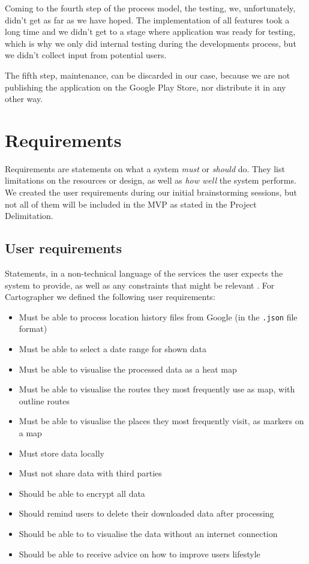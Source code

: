 \documentclass[12p]{article}
\begin{document}
Coming to the fourth step of the process model, the testing, we, unfortunately, didn't get as far as we have hoped. The implementation of all features took a long time and we didn't get to a stage where application was ready for testing, which is why we only did internal testing during the developments process, but we didn't collect input from potential users.

The fifth step, maintenance, can be discarded in our case, because we are not publishing the application on the Google Play Store, nor distribute it in any other way.


\newpage
\section{Requirements} \label{sec:Requirements}
Requirements are statements on what a system \textit{must} or \textit{should} do. They list limitations on the resources or design, as well as \textit{how well} the system performs. We created the user requirements during our initial brainstorming sessions, but not all of them will be included in the MVP as stated in the Project Delimitation. 

\subsection{User requirements} \label{sec:UserRequirements}
Statements, in a non-technical language of the services the user expects the system to provide, as well as any constraints that might be relevant \cite{Requirements}. For Cartographer we defined the following user requirements:

\begin{itemize}
    \item Must be able to process location history files from Google (in the \texttt{.json} file format)
    \item Must be able to select a date range for shown data
    \item Must be able to visualise the processed data as a heat map
    \item Must be able to visualise the routes they most frequently use as map, with outline routes
    \item Must be able to visualise the places they most frequently visit, as markers on a map
    \item Must store data locally
    \item Must not share data with third parties
    \item Should be able to encrypt all data
    \item Should remind users to delete their downloaded data after processing
    \item Should be able to to visualise the data without an internet connection
    \item Should be able to receive advice on how to improve users lifestyle
\end{itemize}
\end{document}
